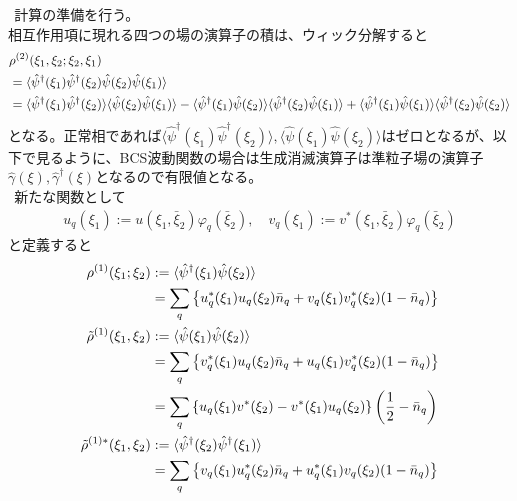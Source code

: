 \documentclass[dvipdfmx, 11pt, a4paper]{jsarticle}
\numberwithin{equation}{section}
\theoremstyle{definition}
\begin{document}
    $\ \ $計算の準備を行う。\\
    相互作用項に現れる四つの場の演算子の積は、ウィック分解すると
    \begin{align}
        &\rho^{(2)}(\xi_1,\xi_2;\xi_2,\xi_1) \notag \\
        &= \langle \hat{\psi}^\dagger(\xi_1)\hat{\psi}^\dagger(\xi_2)\hat{\psi}(\xi_2)\hat{\psi}(\xi_1)\rangle  \notag \\
        &= \langle \hat{\psi}^\dagger(\xi_1)\hat{\psi}^\dagger(\xi_2)\rangle \langle \hat{\psi}(\xi_2)\hat{\psi}(\xi_1)\rangle  - \langle \hat{\psi}^\dagger(\xi_1)\hat{\psi}(\xi_2)\rangle \langle \hat{\psi}^\dagger(\xi_2)\hat{\psi}(\xi_1)\rangle  + \langle \hat{\psi}^\dagger(\xi_1)\hat{\psi}(\xi_1)\rangle \langle \hat{\psi}^\dagger(\xi_2)\hat{\psi}(\xi_2)\rangle 
    \end{align}
    となる。正常相であれば$\langle \hat{\psi}^\dagger(\xi_1)\hat{\psi}^\dagger(\xi_2)\rangle ,\langle \hat{\psi}(\xi_1)\hat{\psi}(\xi_2)\rangle $はゼロとなるが、以下で見るように、BCS波動関数の場合は生成消滅演算子は準粒子場の演算子$\hat{\gamma}(\xi),\hat{\gamma}^\dagger(\xi)$となるので有限値となる。\\
    $\ \ $新たな関数として
    \begin{align}
        u_q(\xi_1) := u(\xi_1,\bar{\xi}_2)\varphi_q(\bar{\xi}_2),\quad v_q(\xi_1) := v^*(\xi_1,\bar{\xi}_2)\varphi_q(\bar{\xi}_2)
    \end{align}
    と定義すると
    \begin{align}
        \rho^{(1)}(\xi_1;\xi_2) &:= \langle \hat{\psi}^\dagger(\xi_1)\hat{\psi}(\xi_2)\rangle \label{BDGtuiKans} \\
        &= \sum_q\left\{ u_q^*(\xi_1)u_q(\xi_2)\bar{n}_q+v_q(\xi_1)v_q^*(\xi_2)(1-\bar{n}_q) \right\}  \\
        \tilde{\rho}^{(1)}(\xi_1,\xi_2) &:= \langle \hat{\psi}(\xi_1)\hat{\psi}(\xi_2)\rangle  \notag \\
        &= \sum_q \left\{ v^*_q(\xi_1)u_q(\xi_2)\bar{n}_q + u_q(\xi_1) v^*_q(\xi_2) (1-\bar{n}_q)\right\} \\
        &= \sum_q\left\{ u_q(\xi_1)v^*(\xi_2) - v^*(\xi_1)u_q(\xi_2)\right\}\left(\frac{1}{2}-\bar{n}_q\right) \label{tilderhoiChi} \\
        \tilde{\rho}^{(1)*}(\xi_1,\xi_2) &:= \langle \hat{\psi}^\dagger(\xi_2)\hat{\psi}^\dagger(\xi_1)\rangle  \notag \\
        &= \sum_q \left\{ v_q(\xi_1)u_q^*(\xi_2)\bar{n}_q + u_q^*(\xi_1) v_q(\xi_2) (1-\bar{n}_q)\right\}  \\
    \end{align}
\end{document}
